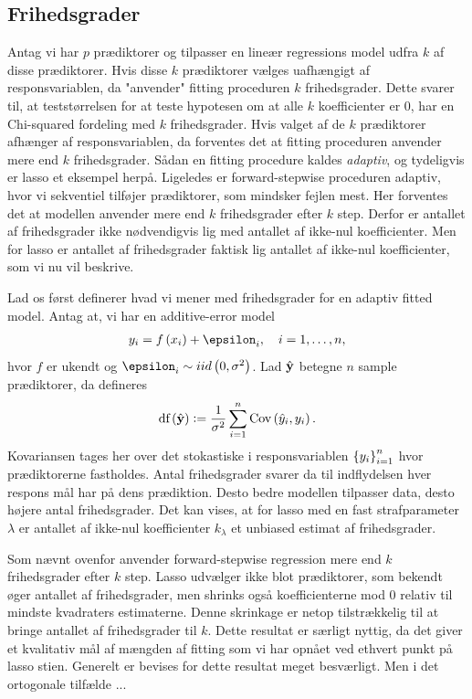\subsection{Frihedsgrader}
Antag vi har \(p\) prædiktorer og tilpasser en lineær regressions model udfra \(k\) af disse prædiktorer.
Hvis disse \(k\) prædiktorer vælges uafhængigt af responsvariablen, da "anvender" fitting proceduren \(k\) frihedsgrader.
Dette svarer til, at teststørrelsen for at teste hypotesen om at alle \(k\) koefficienter er 0, har en Chi-squared fordeling med \(k\) frihedsgrader.
%
Hvis valget af de \(k\) prædiktorer afhænger af responsvariablen, da forventes det at fitting proceduren anvender mere end \(k\) frihedsgrader. 
Sådan en fitting procedure kaldes \textit{adaptiv}, og tydeligvis er lasso et eksempel herpå.
Ligeledes er forward-stepwise proceduren adaptiv, hvor vi sekventiel tilføjer prædiktorer, som mindsker fejlen mest.
Her forventes det at modellen anvender mere end \(k\) frihedsgrader efter \(k\) step.
Derfor er antallet af frihedsgrader ikke nødvendigvis lig med antallet af ikke-nul koefficienter.
Men for lasso er antallet af frihedsgrader faktisk lig antallet af ikke-nul koefficienter, som vi nu vil beskrive.

Lad os først definerer hvad vi mener med frihedsgrader for en adaptiv fitted model. 
Antag at, vi har en additive-error model
\begin{align*}
y_i = f \del{x_i} + \epsilon_i, \quad i = 1, \ldots, n,
\end{align*}
hvor \(f\) er ukendt og \(\epsilon_i \sim iid \del{0, \sigma^2}\).
Lad \(\hat{\mathbf{y}}\) betegne \(n\) sample prædiktorer, da defineres 
\begin{align*}
\text{df}\del{\hat{\y}} := \frac{1}{\sigma^2} \sum_{i=1}^n \text{Cov}\del{\hat{y}_i, y_i}.
\end{align*}
Kovariansen tages her over det stokastiske i responsvariablen \(\cbr{y_i}_{i=1}^n\) hvor prædiktorerne fastholdes.
Antal frihedsgrader svarer da til indflydelsen hver respons mål har på dens prædiktion.
Desto bedre modellen tilpasser data, desto højere antal frihedsgrader.
Det kan vises, at for lasso med en fast strafparameter \(\lambda\) er antallet af ikke-nul koefficienter \(k_\lambda\) et unbiased estimat af frihedsgrader.

Som nævnt ovenfor anvender forward-stepwise regression mere end \(k\) frihedsgrader efter \(k\) step.
Lasso udvælger ikke blot prædiktorer, som bekendt øger antallet af frihedsgrader, men shrinks også koefficienterne mod 0 relativ til mindste kvadraters estimaterne.
Denne skrinkage er netop tilstrækkelig til at bringe antallet af frihedsgrader til \(k\).
Dette resultat er særligt nyttig, da det giver et kvalitativ mål af mængden af fitting som vi har opnået ved ethvert punkt på lasso stien.
Generelt er bevises for dette resultat meget besværligt.
Men i det ortogonale tilfælde ...

